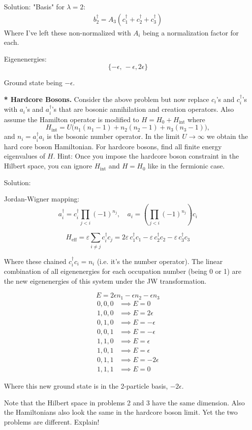 \begin{homeworkProblem}
\begin{callout}{Solution:}
    "Basis" for $\lambda=2$:
    \begin{align*}
        b_{2}^{\dagger} = A_{3}(c_{1}^{\dagger} + c_{2}^{\dagger} + c_{3}^{\dagger})
    \end{align*}
    Where I've left these non-normalized with $A_i$ being a normalization factor for each.

    Eigenenergies:
        $$\{ -\epsilon,\, -\epsilon, 2\epsilon \}$$

    Ground state being $-\epsilon$.

\end{callout}
\end{homeworkProblem}

\newpage \begin{homeworkProblem}
\textbf{* Hardcore Bosons.} Consider the above problem but now replace $c_i$'s and $c_i^\dagger$'s with $a_i$'s and $a_i^\dagger$'s that are bosonic annihilation and creation operators. Also assume the Hamilton operator is modified to $H = H_0 + H_{\text{int}}$ where
\[
H_{\text{int}} = U\Big(n_1(n_1-1) + n_2(n_2-1) + n_3(n_3-1)\Big),
\]
and $n_i = a_i^\dagger a_i$ is the bosonic number operator. In the limit $U \to \infty$ we obtain the hard core boson Hamiltonian. For hardcore bosons, find all finite energy eigenvalues of $H$. Hint: Once you impose the hardcore boson constraint in the Hilbert space, you can ignore $H_{\text{int}}$ and $H = H_0$ like in the fermionic case.
\begin{callout}{Solution:}

    Jordan-Wigner mapping:
$$a_i^\dagger = c_i^\dagger \prod_{j < i} (-1)^{n_j}, \quad a_i = \left(\prod_{j < i} (-1)^{n_j}\right) c_i$$

$$H_{\text{eff}} = \varepsilon \sum_{i \neq j} c_i^\dagger c_j
= 2\varepsilon\, c_1^\dagger c_1 - \varepsilon\, c_2^\dagger c_2 - \varepsilon\, c_3^\dagger c_3$$

Where these chained $c_i^\dagger c_i=n_i$ (i.e. it's the number operator). The linear combination of all eigenenergies for each occupation number (being 0 or 1) are the new eigenenergies of this system under the JW transformation.

$$E = 2 \epsilon n_{1} - \epsilon n_{2} - \epsilon n_{3}$$
\begin{align*}
    0,0,0 &\implies E=0
    \\ 1,0,0 &\implies E=2 \epsilon
    \\ 0,1,0 &\implies E=-\epsilon
    \\ 0,0,1 &\implies E=-\epsilon
    \\ 1,1,0 &\implies E=\epsilon
    \\ 1,0,1 &\implies E=\epsilon
    \\ 0,1,1 &\implies E=-2\epsilon
    \\ 1,1,1 &\implies E=0
\end{align*}

Where this new ground state is in the 2-particle basis, $-2 \epsilon$.
\end{callout}
\end{homeworkProblem}

\newpage \begin{homeworkProblem}
Note that the Hilbert space in problems 2 and 3 have the same dimension. Also the Hamiltonians also look the same in the hardcore boson limit. Yet the two problems are different. Explain!
\end{homeworkProblem}
